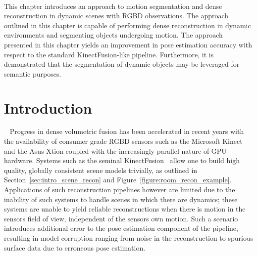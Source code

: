 ~\label{chap:moseg}
\begin{chapterabstract}
This chapter introduces an approach to motion segmentation and dense reconstruction 
in dynamic scenes with RGBD observations. The approach outlined in this chapter is 
capable of performing dense reconstruction in dynamic environments and segmenting objects 
undergoing motion. The approach presented in this chapter yields an improvement in pose 
estimation accuracy with respect to the standard KinectFusion-like pipeline. Furthermore, 
it is demonstrated that the segmentation of dynamic objects may be leveraged for semantic 
purposes.
\end{chapterabstract}

\section{Introduction}
~\label{sec:moseg_introduction}
Progress in dense volumetric fusion has been accelerated in recent years with
the availability of consumer grade RGBD sensors such as the Microsoft Kinect and
the Asus Xtion coupled with the increasingly parallel nature of GPU hardware. Systems such 
as the seminal KinectFusion~\cite{Newcombe2011} allow one to build high quality, globally 
consistent scene models trivially, as outlined in Section~\ref{sec:intro_scene_recon} and 
Figure~\ref{figure:room_recon_example}.
Applications of such reconstruction pipelines however are limited due to the 
inability of such systems to handle scenes in which there are dynamics; these 
systems are unable to yield reliable reconstructions when there is motion in the 
sensors field of view, independent of the sensors own motion. Such a scenario introduces
additional error to the pose estimation component of the pipeline, resulting in
model corruption ranging from noise in the reconstruction to spurious 
surface data due to erroneous pose estimation.

